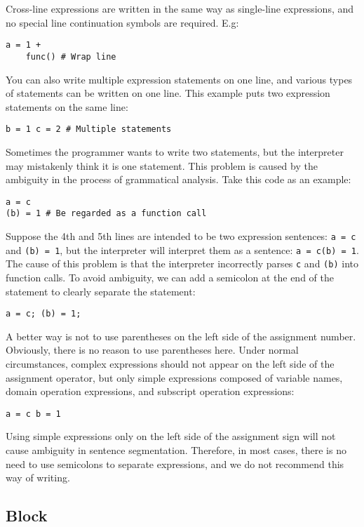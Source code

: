 Cross-line expressions are written in the same way as single-line expressions, and no special line continuation symbols are required. E.g:
\begin{lstlisting}[language=berry, numbers=none]
a = 1 +
    func() # Wrap line
\end{lstlisting}
You can also write multiple expression statements on one line, and various types of statements can be written on one line. This example puts two expression statements on the same line:
\begin{lstlisting}[language=berry, numbers=none]
b = 1 c = 2 # Multiple statements
\end{lstlisting}

Sometimes the programmer wants to write two statements, but the interpreter may mistakenly think it is one statement. This problem is caused by the ambiguity in the process of grammatical analysis. Take this code as an example:
\begin{lstlisting}[language=berry, numbers=none]
a = c
(b) = 1 # Be regarded as a function call
\end{lstlisting}
Suppose the 4th and 5th lines are intended to be two expression sentences: \texttt{a = c} and \texttt{(b) = 1}, but the interpreter will interpret them as a sentence: \texttt{a = c(b) = 1}. The cause of this problem is that the interpreter incorrectly parses \texttt{c} and \texttt{(b)} into function calls. To avoid ambiguity, we can add a semicolon at the end of the statement to clearly separate the statement:
\begin{lstlisting}[language=berry, numbers=none]
a = c; (b) = 1;
\end{lstlisting}
A better way is not to use parentheses on the left side of the assignment number. Obviously, there is no reason to use parentheses here. Under normal circumstances, complex expressions should not appear on the left side of the assignment operator, but only simple expressions composed of variable names, domain operation expressions, and subscript operation expressions:
\begin{lstlisting}[language=berry, numbers=none]
a = c b = 1
\end{lstlisting}
Using simple expressions only on the left side of the assignment sign will not cause ambiguity in sentence segmentation. Therefore, in most cases, there is no need to use semicolons to separate expressions, and we do not recommend this way of writing.

\subsection {Block} \label{section::block}

